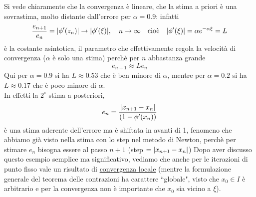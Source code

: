 Si vede chiaramente che la convergenza è lineare, che la stima a priori è una sovrastima, molto distante dall'errore per $\alpha = 0.9$: infatti
\[\frac{e_{n+1}}{e_n} = \lvert\phi'(z_n)\rvert \to \lvert\phi'(\xi)\rvert, \quad n \to \infty \quad \text{cioè} \quad \lvert\phi'(\xi)\rvert = \alpha e^{-\alpha \xi} = L\]
è la costante asintotica, il parametro che effettivamente regola la velocità di convergenza ($\alpha$ è solo una stima) perchè per $n$ abbastanza grande
\[e_{n+1} \approx Le_n\]
Qui per $\alpha=0.9$ si ha $L \approx 0.53$ che è ben minore di $\alpha$, mentre per $\alpha=0.2$ si ha $L \approx 0.17$ che è poco minore di $\alpha$.\\
In effetti la $2^\circ$ stima a posteriori,
\[e_n = \frac{\lvert x_{n+1} - x_n\rvert}{(1 - \phi'(x_n))}\]
è una stima aderente dell'errore ma è shiftata in avanti di 1, fenomeno che abbiamo già visto nella stima con lo step nel metodo di Newton, perchè per stimare $e_n$ bisogna essere al passo $n+1$ (step $=\lvert x_{n+1}-x_n\rvert$)
\newline \newline
Dopo aver discusso questo esempio semplice ma significativo, vediamo che anche per le iterazioni di punto fisso vale un risultato di \uline{convergenza locale} (mentre la formulazione generale del teorema delle contrazioni ha
carattere ``globale", visto che $x_0 \in I$ è arbitrario e per la convergenza non è importante che $x_0$ sia vicino a $\xi$).

